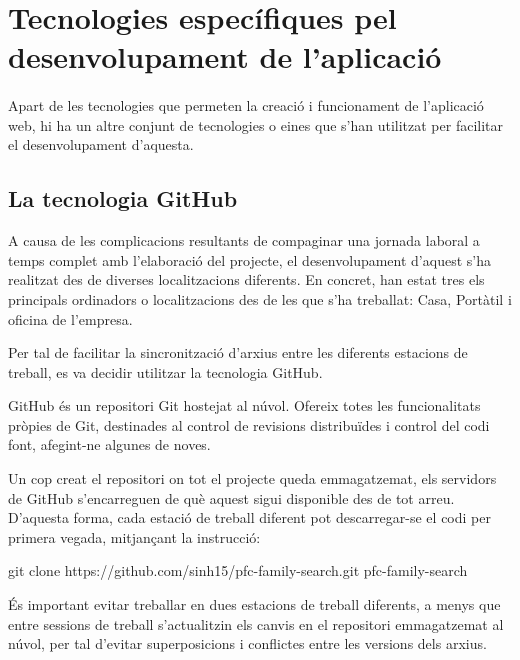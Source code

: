 \section{Tecnologies específiques pel desenvolupament de l'aplicació}

    \paragraph{}
    Apart de les tecnologies que permeten la creació i funcionament de l'aplicació web, hi ha un altre conjunt de tecnologies o eines que s'han utilitzat per facilitar el desenvolupament d'aquesta.

    \subsection{La tecnologia GitHub}

    A causa de les complicacions resultants de compaginar una jornada laboral a temps complet amb l'elaboració del projecte, el desenvolupament d’aquest s’ha realitzat des de diverses localitzacions diferents. En concret, han estat tres els principals ordinadors o localitzacions des de les que s’ha treballat: Casa, Portàtil i oficina de l'empresa.

    Per tal de facilitar la sincronització d'arxius entre les diferents estacions de treball, es va decidir utilitzar la tecnologia GitHub.

    GitHub és un repositori Git hostejat al núvol. Ofereix totes les funcionalitats pròpies de Git, destinades al control de revisions distribuïdes i control del codi font, afegint-ne algunes de noves.

    Un cop creat el repositori on tot el projecte queda emmagatzemat, els servidors de GitHub s’encarreguen de què aquest sigui disponible des de tot arreu. D’aquesta forma, cada estació de treball diferent pot descarregar-se el codi per primera vegada, mitjançant la instrucció:

    \begin{displayquote}
        git clone https://github.com/sinh15/pfc-family-search.git pfc-family-search
    \end{displayquote}

    És important evitar treballar en dues estacions de treball diferents, a menys que entre sessions de treball s’actualitzin els canvis en el repositori emmagatzemat al núvol, per tal d’evitar superposicions i conflictes entre les versions dels arxius.

